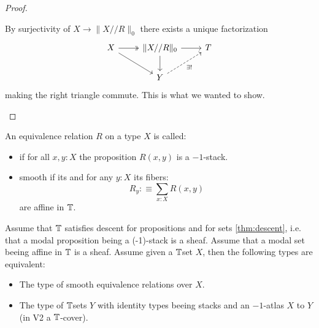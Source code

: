 \documentclass{article}
\begin{document}
\begin{proof}
\begin{itemize}
    By surjectivity of $X \to \|X // R \|_0$ there exists a unique factorization 
\[\begin{tikzcd}
	X & {\|X // R\|_0} & T \\
	& Y
	\arrow[two heads, from=1-1, to=1-2]
	\arrow[from=1-1, to=2-2]
	\arrow[from=1-2, to=1-3]
	\arrow[from=1-2, to=2-2]
	\arrow["{\exists!}"', dashed, from=2-2, to=1-3]
\end{tikzcd}\]
making the right triangle commute. This is what we wanted to show.
\end{itemize}
\end{proof}

\begin{definition}
An equivalence relation $R$ on a type $X$ is called:
\begin{itemize}
\item  if for all $x,y:X$ the proposition $R(x,y)$ is a  $-1$-stack.
\item smooth if its  and for any $y:X$ its fibers:
\[R_y :\equiv \sum_{x:X} R(x,y)\]
are affine in $\mathbb{T}$.
\end{itemize}
\end{definition}

\begin{lemma}\label{fundamental-propriety-algebraic-spaces}
Assume that $\mathbb{T}$ satisfies descent for propositions and for sets \ref{thm:descent}, i.e. that a modal proposition being a  (-1)-stack is a sheaf. Assume that a modal set beeing affine in $\mathbb{T}$ is a sheaf.
Assume given a $\mathbb{T}$set $X$, then the following types are equivalent:
\begin{itemize}
\item The type of smooth equivalence relations over $X$.
\item The type of $\mathbb{T}$sets $Y$ with identity types beeing  stacks and an $-1$-atlas $X$ to $Y$ (in V2 a $\mathbb{T}$-cover).
\end{itemize}
\end{lemma}
\end{document}
